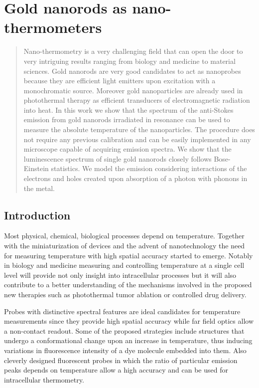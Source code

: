 \chapter{Gold nanorods as nano-thermometers}
\label{ch:AntiStokes}

\begin{abstract}
Nano-thermometry is a very challenging field that can open the door to very
intriguing results ranging from biology and medicine to material sciences. Gold
nanorods are very good candidates to act as nanoprobes because they are
efficient light emitters upon excitation with a monochromatic source. Moreover
gold nanoparticles are already used in photothermal therapy as efficient
transducers of electromagnetic radiation into heat. In this work we show that
the spectrum of the anti-Stokes emission from gold nanorods irradiated in
resonance can be used to measure the absolute temperature of the nanoparticles.
The procedure does not require any previous calibration and can be easily
implemented in any microscope capable of acquiring emission spectra. We show
that the luminescence spectrum of single gold nanorods closely follows
Bose-Einstein statistics. We model the emission considering interactions of the
electrons and holes created upon absorption of a photon with phonons in the
metal.
\end{abstract}

\section{Introduction}
Most physical, chemical, biological processes depend on temperature. Together
with the miniaturization of devices and the advent of nanotechnology the need
for measuring temperature with high spatial accuracy started to emerge. Notably
in biology\cite{Yang2011a,Hrelescu2010} and medicine\cite{Li2013c} measuring and
controlling temperature at a single cell level will provide not only insight
into intracellular processes but it will also contribute to a better
understanding of the mechanisms involved in the proposed new therapies such as
photothermal tumor ablation\cite{Gobin2007} or controlled drug
delivery\cite{Huang2006,Huo2014}. 

Probes with distinctive spectral features are ideal candidates for temperature
measurements since they provide high spatial accuracy while far field optics
allow a non-contact readout. Some of the proposed strategies include structures
that undergo a conformational change upon an increase in
temperature\cite{Ebrahimi2014}, thus inducing variations in fluorescence
intensity of a dye molecule embedded into them. Also cleverly designed
fluorescent probes\cite{Vetrone2010} in which the ratio of particular emission
peaks depends on temperature allow a high accuracy and can be used for
intracellular thermometry.

